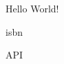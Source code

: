 \documentclass{minimal}
\begin{document}
Hello World!

\gls{isbn}

\gls{API}

\printunsrtglossaries
\end{document}
